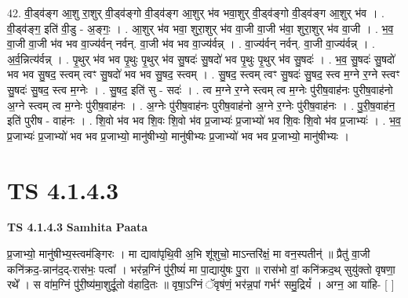 \documentclass[17pt]{extarticle}
\begin{document}
42. वी॒ड्व॑ङ्ग आ॒शु रा॒शुर् वी॒ड्व॑ङ्गो वी॒ड्व॑ङ्ग आ॒शुर् भ॑व भवा॒शुर् वी॒ड्व॑ङ्गो वी॒ड्व॑ङ्ग आ॒शुर् भ॑व । . वी॒ड्व॑ङ्ग॒ इति॑ वी॒डु - अ॒ङ्गः॒ । . आ॒शुर् भ॑व भवा॒ शुरा॒शुर् भ॑व वा॒जी वा॒जी भ॑वा॒ शुरा॒शुर् भ॑व वा॒जी । . भ॒व॒ वा॒जी वा॒जी भ॑व भव वा॒ज्य॑र्वन् नर्वन्. वा॒जी भ॑व भव वा॒ज्य॑र्वन्न् । . वा॒ज्य॑र्वन् नर्वन्. वा॒जी वा॒ज्य॑र्वन्न् । . अ॒र्व॒न्नित्य॑र्वन्न् । . पृ॒थुर् भ॑व भव पृ॒थुः पृ॒थुर् भ॑व सु॒षदः॑ सु॒षदो॑ भव पृ॒थुः पृ॒थुर् भ॑व सु॒षदः॑ । . भ॒व॒ सु॒षदः॑ सु॒षदो॑ भव भव सु॒षद॒ स्त्वम् त्वꣳ सु॒षदो॑ भव भव सु॒षद॒ स्त्वम् । . सु॒षद॒ स्त्वम् त्वꣳ सु॒षदः॑ सु॒षद॒ स्त्व म॒ग्ने र॒ग्ने स्त्वꣳ सु॒षदः॑ सु॒षद॒ स्त्व म॒ग्नेः । . सु॒षद॒ इति॑ सु - सदः॑ । . त्व म॒ग्ने र॒ग्ने स्त्वम् त्व म॒ग्नेः पु॑रीष॒वाह॑नः पुरीष॒वाह॑नो अ॒ग्ने स्त्वम् त्व म॒ग्नेः पु॑रीष॒वाह॑नः । . अ॒ग्नेः पु॑रीष॒वाह॑नः पुरीष॒वाह॑नो अ॒ग्ने र॒ग्नेः पु॑रीष॒वाह॑नः । . पु॒री॒ष॒वाह॑न॒ इति॑ पुरीष - वाह॑नः । . शि॒वो भ॑व भव शि॒वः शि॒वो भ॑व प्र॒जाभ्यः॑ प्र॒जाभ्यो॑ भव शि॒वः शि॒वो भ॑व प्र॒जाभ्यः॑ । . भ॒व॒ प्र॒जाभ्यः॑ प्र॒जाभ्यो॑ भव भव प्र॒जाभ्यो॒ मानु॑षीभ्यो॒ मानु॑षीभ्यः प्र॒जाभ्यो॑ भव भव प्र॒जाभ्यो॒ मानु॑षीभ्यः । \newline
\pagebreak
{}

\section{ TS 4.1.4.3 }

\textbf{TS 4.1.4.3 } \newline
\textbf{Samhita Paata} \newline

प्र॒जाभ्यो॒ मानु॑षीभ्य॒स्त्वम॑ङ्गिरः । मा द्यावा॑पृथि॒वी अ॒भि शू॑शुचो॒ माऽन्तरि॑क्षं॒ मा वन॒स्पतीन्॑ ॥ प्रैतु॑ वा॒जी कनि॑क्रद॒-न्नान॑द॒द्-रास॑भः॒ पत्वा᳚ । भर॑न्न॒ग्निं पु॑री॒ष्यं॑ मा पा॒द्यायु॑षः पु॒रा ॥ रास॑भो वां॒ कनि॑क्रद॒थ् सुयु॑क्तो वृषणा॒ रथे᳚ । स वा॑म॒ग्निं पु॑री॒ष्य॑मा॒शुर्दू॒तो व॑हादि॒तः ॥ वृषा॒ऽग्निं ॅवृष॑णं॒ भर॑न्न॒पां गर्भꣳ॑ समु॒द्रियं᳚ । अग्न॒ आ या॑हि- [  ] \newline
\end{document}
